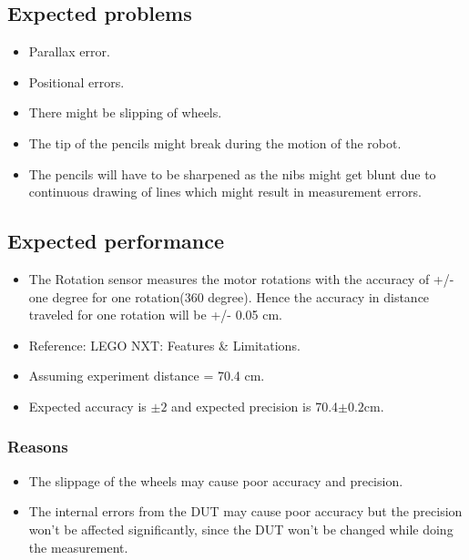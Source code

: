 \documentclass[11pt,a4paper]{article}
\begin{document}
	\subsection{\textbf{Expected problems}}
	\begin{itemize}
		\item Parallax error.
		\item Positional errors.
		\item There might be slipping of wheels.
		\item The tip of the pencils might break during the motion of the robot.
		\item The pencils will have to be sharpened as the nibs might get blunt due to continuous drawing of lines which might result in measurement errors.
	\end{itemize}
	
	\subsection{\textbf{Expected performance}}
	\begin{itemize}
		\item The Rotation sensor measures the motor rotations with the accuracy of +/- one degree for one rotation(360 degree). Hence the accuracy in distance traveled for one rotation will be +/- 0.05 cm. 
		\item Reference: LEGO NXT: Features \& Limitations.
		\item Assuming experiment distance = 70.4 cm.
		\item Expected accuracy is $ \pm 2$ and expected precision is 70.4$ \pm 0.2$cm.
	\end{itemize}
	
	\subsubsection{Reasons}
	\begin{itemize}
		\item The slippage of the wheels may cause poor accuracy and precision.
		\item The internal errors from the DUT may cause poor accuracy but the precision won't be affected significantly, since the DUT won't be changed while doing the measurement.
	\end{itemize}
	
\end{document}
